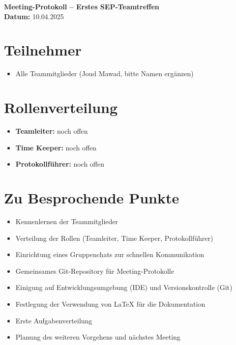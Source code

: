 \documentclass[11pt,a4paper]{article}
\begin{document}
\begin{center}
    {\large \textbf{Meeting-Protokoll – Erstes SEP-Teamtreffen}}\\[0.3em]
    \textbf{Datum:} 10.04.2025
\end{center}

\section*{Teilnehmer}
\begin{itemize}
    \item Alle Teammitglieder (Joud Mawad, bitte Namen ergänzen)
\end{itemize}

\section*{Rollenverteilung}
\begin{itemize}
    \item \textbf{Teamleiter:} noch offen
    \item \textbf{Time Keeper:} noch offen
    \item \textbf{Protokollführer:} noch offen
\end{itemize}

\section*{Zu Besprochende Punkte}
\begin{itemize}
    \item Kennenlernen der Teammitglieder
    \item Verteilung der Rollen (Teamleiter, Time Keeper, Protokollführer)
    \item Einrichtung eines Gruppenchats zur schnellen Kommunikation
    \item Gemeinsames Git-Repository für Meeting-Protokolle
    \item Einigung auf Entwicklungsumgebung (IDE) und Versionskontrolle (Git)
    \item Festlegung der Verwendung von \LaTeX{} für die Dokumentation
    \item Erste Aufgabenverteilung
    \item Planung des weiteren Vorgehens und nächstes Meeting
\end{itemize}
\end{document}
